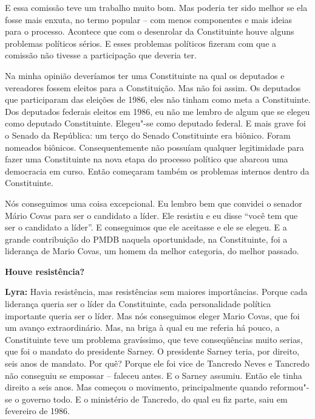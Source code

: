 E essa comissão teve um trabalho muito bom. Mas poderia ter sido melhor
se ela fosse mais enxuta, no termo popular -- com menos componentes e
mais ideias para o processo. Acontece que com o desenrolar da
Constituinte houve alguns problemas políticos sérios. E esses problemas
políticos fizeram com que a comissão não tivesse a participação que
deveria ter.

Na minha opinião deveríamos ter uma Constituinte na qual os deputados e
vereadores fossem eleitos para a Constituição. Mas não foi assim. Os
deputados que participaram das eleições de 1986, eles não tinham como
meta a Constituinte. Dos deputados federais eleitos em 1986, eu não me
lembro de algum que se elegeu como deputado Constituinte. Elegeu"-se como
deputado federal. E mais grave foi o Senado da República: um terço do
Senado Constituinte era biônico. Foram nomeados biônicos.
Consequentemente não possuíam qualquer legitimidade para fazer uma
Constituinte na nova etapa do processo político que abarcou uma
democracia em curso. Então começaram também os problemas internos dentro
da Constituinte.

Nós conseguimos uma coisa excepcional. Eu lembro bem que convidei o
senador Mário Covas para ser o candidato a líder. Ele resistiu e eu
disse ``você tem que ser o candidato a líder''. E conseguimos que ele
aceitasse e ele se elegeu. E a grande contribuição do PMDB naquela
oportunidade, na Constituinte, foi a liderança de Mario Covas, um homem
da melhor categoria, do melhor passado.

\textbf{Houve resistência?}

\textbf{Lyra:} Havia resistência, mas resistências sem maiores
importâncias. Porque cada liderança queria ser o líder da Constituinte,
cada personalidade política importante queria ser o líder. Mas nós
conseguimos eleger Mario Covas, que foi um avanço extraordinário. Mas,
na briga à qual eu me referia há pouco, a Constituinte teve um problema
gravíssimo, que teve conseqüências muito serias, que foi o mandato do
presidente Sarney. O presidente Sarney teria, por direito, seis anos de
mandato. Por quê? Porque ele foi vice de Tancredo Neves e Tancredo não
conseguiu se empossar -- faleceu antes. E o Sarney assumiu. Então ele
tinha direito a seis anos. Mas começou o movimento, principalmente
quando reformou"-se o governo todo. E o ministério de Tancredo, do qual
eu fiz parte, saiu em fevereiro de 1986.

